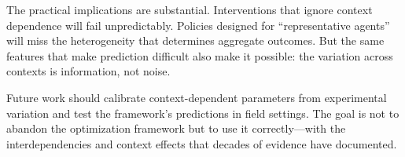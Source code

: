 \documentclass[12pt]{article}
\begin{document}
The practical implications are substantial. Interventions that ignore context dependence will fail unpredictably. Policies designed for ``representative agents'' will miss the heterogeneity that determines aggregate outcomes. But the same features that make prediction difficult also make it possible: the variation across contexts is information, not noise.

Future work should calibrate context-dependent parameters from experimental variation and test the framework's predictions in field settings. The goal is not to abandon the optimization framework but to use it correctly---with the interdependencies and context effects that decades of evidence have documented.



\end{document}
